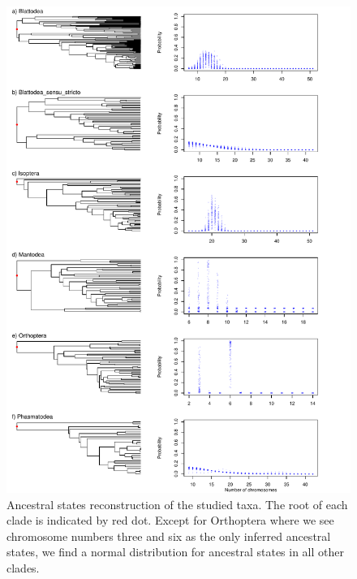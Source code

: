 \begin{figure}
\centering \includegraphics[width=.7\textwidth]{figures/asr_plot.pdf}
\caption{Ancestral states reconstruction of the studied taxa. The root of each clade is indicated by red dot. Except for Orthoptera where we see chromosome numbers three and six as the only inferred ancestral states, we find a normal distribution for ancestral states in all other clades.}
\label{fig:asr}
\end{figure}


